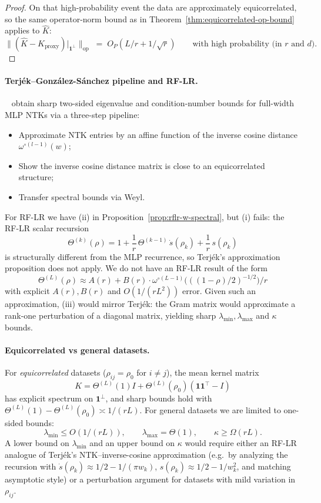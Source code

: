 \begin{proof}
\medskip\noindent
On that high-probability event the data are approximately equicorrelated, so the same operator-norm bound as in Theorem~\ref{thm:equicorrelated-op-bound} applies to \(\hat{K}\):
\[
\bigl\|(\hat{K}-K_{\mathrm{proxy}})|_{\mathbf{1}^\perp}\bigr\|_{\mathrm{op}} \;=\; O_P(L/r+1/\sqrt{r}) \qquad \text{with high probability (in \(r\) and \(d\))}.
\]
\end{proof}

\paragraph{Terjék--González-Sánchez pipeline and RF-LR.}
~\cite{terjek2025mlpsateoc} obtain sharp two-sided eigenvalue and condition-number bounds for full-width MLP NTKs via a three-step pipeline:
\begin{itemize}\setlength{\itemsep}{1pt}
  \item[(i)] Approximate NTK entries by an affine function of the inverse cosine distance \(\omega^{\circ(l-1)}(w)\);
  \item[(ii)] Show the inverse cosine distance matrix is close to an equicorrelated structure;
  \item[(iii)] Transfer spectral bounds via Weyl.
\end{itemize}
For RF-LR we have (ii) in Proposition~\ref{prop:rflr-w-spectral}, but (i) fails: the RF-LR scalar recursion
\[
\Theta^{(k)}(\rho)=1+\frac{1}{r}\,\Theta^{(k-1)}\,\dot{s}(\rho_k)+\frac{1}{r}\,s(\rho_k)
\]
is structurally different from the MLP recurrence, so Terjék's approximation proposition does not apply. We do not have an RF-LR result of the form
\[
\Theta^{(L)}(\rho)\approx A(r)+B(r)\cdot\omega^{\circ(L-1)}\bigl(((1-\rho)/2)^{-1/2}\bigr)/r
\]
with explicit \(A(r),B(r)\) and \(O(1/(rL^2))\) error. Given such an approximation, (iii) would mirror Terjék: the Gram matrix would approximate a rank-one perturbation of a diagonal matrix, yielding sharp \(\lambda_{\min},\lambda_{\max}\) and \(\kappa\) bounds.

\paragraph{Equicorrelated vs general datasets.}
For \emph{equicorrelated} datasets (\(\rho_{ij}=\rho_0\) for \(i\neq j\)), the mean kernel matrix
\[
K=\Theta^{(L)}(1)I+\Theta^{(L)}(\rho_0)(\mathbf{1}\mathbf{1}^\top-I)
\]
has explicit spectrum on \(\mathbf{1}^\perp\), and sharp bounds hold with \(\Theta^{(L)}(1)-\Theta^{(L)}(\rho_0)\asymp 1/(rL)\). For general datasets we are limited to one-sided bounds:
\[
\lambda_{\min}\le O(1/(rL)),\qquad \lambda_{\max}=\Theta(1),\qquad \kappa\ge\Omega(rL).
\]
A lower bound on \(\lambda_{\min}\) and an upper bound on \(\kappa\) would require either an RF-LR analogue of Terjék's NTK--inverse-cosine approximation (e.g.\ by analyzing the recursion with \(\dot{s}(\rho_k)\approx 1/2-1/(\pi w_k)\), \(s(\rho_k)\approx 1/2-1/w_k^2\), and matching asymptotic style) or a perturbation argument for datasets with mild variation in \(\rho_{ij}\).

